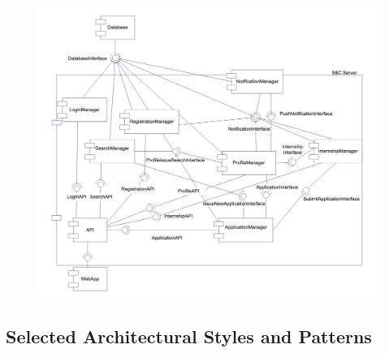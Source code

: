 \newpage
\begin{figure}[h!]
        \centering  \includegraphics[width=1\textwidth]{DD/Images/CD.png}
        \label{fig:ComponentViewDiagram}
\end{figure}
\newpage

\subsection{Selected Architectural Styles and Patterns}
